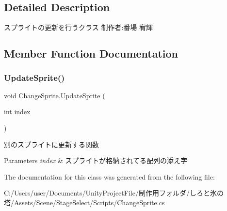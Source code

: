 \subsection{Detailed Description}
スプライトの更新を行うクラス 制作者\+:番場 宥輝 



\subsection{Member Function Documentation}
\mbox{\label{class_change_sprite_a0a8b79dab7e5c72e511b9c0c79103229}} 
\subsubsection{\texorpdfstring{Update\+Sprite()}{UpdateSprite()}}
{\footnotesize\ttfamily void Change\+Sprite.\+Update\+Sprite (\begin{DoxyParamCaption}\item[{int}]{index }\end{DoxyParamCaption})\hspace{0.3cm}{\ttfamily [inline]}}



別のスプライトに更新する関数 


\begin{DoxyParams}{Parameters}
{\em index} & スプライトが格納されてる配列の添え字\\
\hline
\end{DoxyParams}


The documentation for this class was generated from the following file\+:\begin{DoxyCompactItemize}
\item 
C\+:/\+Users/user/\+Documents/\+Unity\+Project\+File/制作用フォルダ/しろと氷の塔/\+Assets/\+Scene/\+Stage\+Select/\+Scripts/Change\+Sprite.\+cs\end{DoxyCompactItemize}

